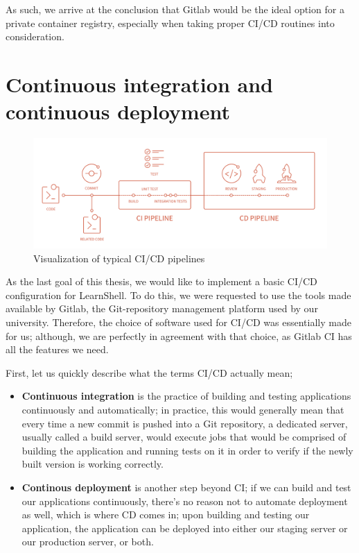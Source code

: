 \documentclass[thesis=B,english]{FITthesis}[2019/12/23]
\begin{document}
As such, we arrive at the conclusion that Gitlab would be the ideal option for a private container registry, especially when taking proper CI/CD routines into consideration.

\section{Continuous integration and continuous deployment}

\begin{figure}[H]
\centering
\caption{Visualization of typical CI/CD pipelines \cite{cicd-diagram}}
\hspace*{-2cm}
\includegraphics[scale=0.3]{cicd}
\end{figure}

As the last goal of this thesis, we would like to implement a basic CI/CD configuration for LearnShell. To do this, we were requested to use the tools made available by Gitlab, the Git-repository management platform used by our university. Therefore, the choice of software used for CI/CD was essentially made for us; although, we are perfectly in agreement with that choice, as Gitlab CI has all the features we need.

First, let us quickly describe what the terms CI/CD actually mean;

\begin{itemize}
  \setlength\itemsep{0em}
  \item \textbf{Continuous integration} is the practice of building and testing applications continuously and automatically; in practice, this would generally mean that every time a new commit is pushed into a Git repository, a dedicated server, usually called a build server, would execute jobs that would be comprised of building the application and running tests on it in order to verify if the newly built version is working correctly.
  \item \textbf{Continous deployment} is another step beyond CI; if we can build and test our applications continuously, there's no reason not to automate deployment as well, which is where CD comes in; upon building and testing our application, the application can be deployed into either our staging server or our production server, or both. \cite{cd-guide}
\end{itemize}
 
\end{document}
